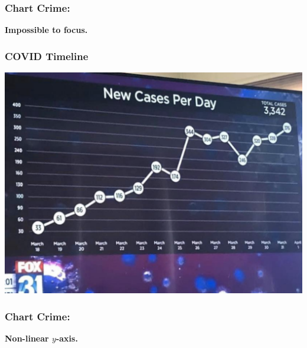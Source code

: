\documentclass[aspectratio=169]{beamer}
\theoremstyle{principle}
\begin{document}
\begin{frame}
\frametitle{Chart Crime:}

\begin{center}
\huge \textbf{Impossible to focus.}
\end{center}

\end{frame}

\begin{frame}
\frametitle{COVID Timeline}
\begin{center}
\includegraphics[scale=0.4]{bs_nonlinear_y_axis.png}
\end{center}

\end{frame}

\begin{frame}
\frametitle{Chart Crime:}

\begin{center}
\huge \textbf{Non-linear $y$-axis.}
\end{center}

\end{frame}
\end{document}
